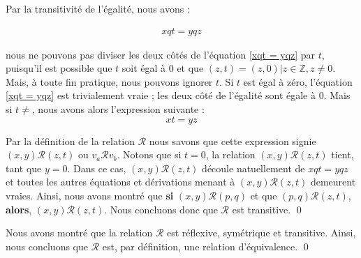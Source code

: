 \documentclass[16pt]{report}
\begin{document}
\begin{multicols*}{2}
\begin{Preuve}{}{}
                 Par la transitivité de l'égalité, nous avons : 

                 \begin{align}
                     xqt = yqz \label{xqt = yqz}  
                 \end{align}

                 nous ne pouvons pas diviser les deux côtés de l'équation \eqref{xqt = yqz} par $t$, puisqu'il 
                 est possible que $t$ soit égal à $0$ et que $(z, t) = (z, 0) | z \in \mathbb{Z}, z \neq 0 $. 
                 Mais, à toute fin pratique, nous pouvons ignorer $t$. Si $t$ est égal à zéro, 
                 l'équation \eqref{xqt = yqz} est trivialement vraie ; les deux côté de l'égalité sont égale 
                 à 0. Mais si $t \neq$, nous avons alors l'expression suivante : 
                 \[ xt = yz\]

                 Par la définition de la relation $\mathcal{R}$ nous savons que cette expression signie 
                 $(x, y)\mathcal{R}(z, t)$ ou $v_a\mathcal{R}v_b$. Notons que si $t = 0$, la relation 
                 $(x, y)\mathcal{R}(z, t)$ tient, tant que $y = 0$. Dans ce cas, $(x, y)\mathcal{R}(z, t)$ 
                 découle natuellement de $xqt = yqz$ et toutes les autres équations et dérivations 
                 menant à $(x, y)\mathcal{R}(z, t)$ demeurent vraies. Ainsi, nous avons montré que 
                 \textbf{si}   $(x, y) \mathcal{R}(p, q)$ et que  $(p, q)\mathcal{R}(z, t)$, \textbf{alors}, 
                 $(x, y)\mathcal{R}(z, t)$. Nous concluons donc que $\mathcal{R}$ est transitive. \qed

            \end{Preuve}

            \begin{Reponse*}{}{}
                Nous avons montré que la relation $\mathcal{R}$ est réflexive, symétrique et transitive. 
                Ainsi, nous concluons que $\mathcal{R}$ est, par définition, une relation d'équivalence. \qed 
            \end{Reponse*}



\end{multicols*}
\end{document}

